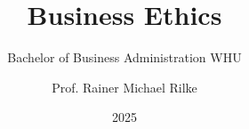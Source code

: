\setlength{\columnsep}{1pt}

\newcommand{\twocolslide}[5]{%
  \begin{frame}
    \frametitle{#1}
    \begin{columns}[T,onlytextwidth]
      \begin{column}{#4\textwidth} %
         \vfill
        \begin{minipage}[c][0.9\textheight][c]{\linewidth}
          #2
        \end{minipage}
        \vfill        
      \end{column}
      \begin{column}{#5\textwidth} %
       \vfill
        \begin{minipage}[c][0.9\textheight][c]{\linewidth}
          #3
        \end{minipage}
        \vfill
      \end{column}
    \end{columns}
  \end{frame}
}

\AtBeginSection[]{
  \begin{frame}[plain]
    \centering
    {\color{WHUblue}\LARGE\bfseries\insertsection}
  \end{frame}
}

\AtBeginSubsection[]{
  \begin{frame}[plain]
    \centering
    \vfill
    {\color{WHUblue}\large\insertsection}
    
    \vspace{1em}
    \color{WHUblue}\Huge\bfseries\insertsubsection
    \vfill
  \end{frame}
}

\title{Business Ethics}
\subtitle{Bachelor of Business Administration WHU}
\author[Rilke]{Prof. Rainer Michael Rilke }
\date{2025}